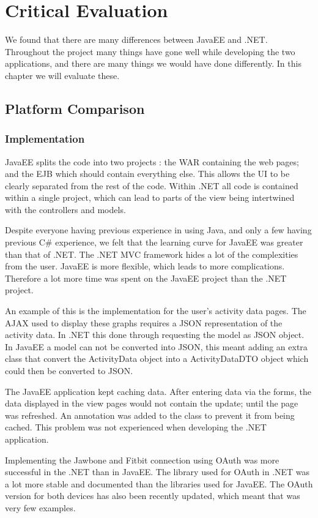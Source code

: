 \chapter{Critical Evaluation}

We found that there are many differences between JavaEE and .NET. Throughout the project many things have gone well while developing the two applications, and there are many things we would have done differently. In this chapter we will evaluate these.

\section{Platform Comparison}

\subsection{Implementation}
JavaEE splits the code into two projects : the WAR containing the web pages; and the EJB which should contain everything else. This allows the UI to be clearly separated from the rest of the code. Within .NET all code is contained within a single project, which can lead to parts of the view being intertwined with the controllers and models.

Despite everyone having previous experience in using Java, and only a few having previous C\# experience, we felt that the learning curve for JavaEE was greater than that of .NET. The .NET MVC framework hides a lot of the complexities from the user. JavaEE is more flexible, which leads to more complications. Therefore a lot more time was spent on the JavaEE project than the .NET project.

An example of this is the implementation for the user's activity data pages. The AJAX used to display these graphs requires a JSON representation of the activity data. In .NET this done through requesting the model as JSON object. In JavaEE a model can not be converted into JSON, this meant adding an extra class that convert the ActivityData object into a ActivityDataDTO object which could then be converted to JSON. 

The JavaEE application kept caching data. After entering data via the forms, the data displayed in the view pages would not contain the update; until the page was refreshed. An annotation was added to the class to prevent it from being cached. This problem was not experienced when developing the .NET application.

Implementing the Jawbone and Fitbit connection using OAuth was more successful in the .NET than in JavaEE. The library used for OAuth in .NET was a lot more stable and documented than the libraries used for JavaEE. The OAuth version for both devices has also been recently updated, which meant that was very few examples. 

